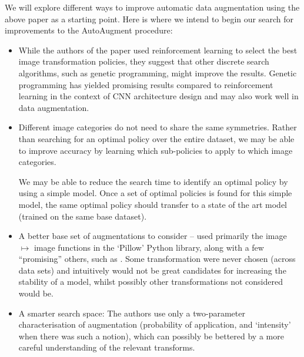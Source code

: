 \documentclass[10pt,twocolumn,letterpaper]{article}
\begin{document}
We will explore different ways to improve automatic data augmentation using the above paper as a starting point. Here is where we intend to begin our search for improvements to the AutoAugment procedure:%

\begin{itemize}
\item %
While the authors of the paper used reinforcement learning to select the best image transformation policies, they suggest that other discrete search algorithms, such as genetic programming, might improve the results. Genetic programming has yielded promising results compared to reinforcement learning in the context of CNN architecture design \cite{Real2018} and may also work well in data augmentation.
\item %
Different image categories do not need to share the same symmetries. Rather than searching for an optimal policy over the entire dataset, we may be able to improve accuracy by learning which sub-policies to apply to which image categories. 

We may be able to reduce the search time to identify an optimal policy by using a simple model. Once a set of optimal policies is found for this simple model, the same optimal policy should transfer to a state of the art model (trained on the same base dataset).

\item A better base set of augmentations to consider -- \cite{Cubuk2018} used primarily the image $\mapsto$ image functions in the `Pillow' Python library, along with a few ``promising'' others, such as \cite{Devries2017}. Some transformation were never chosen (across data sets) and intuitively would not be great candidates for increasing the stability of a model, whilst possibly other transformations not considered would be.
\item A smarter search space: The authors use only a two-parameter characterisation of augmentation (probability of application, and ‘intensity’ when there was such a notion), which can possibly be bettered by a more careful understanding of the relevant transforms.
\end{itemize}
\end{document}
